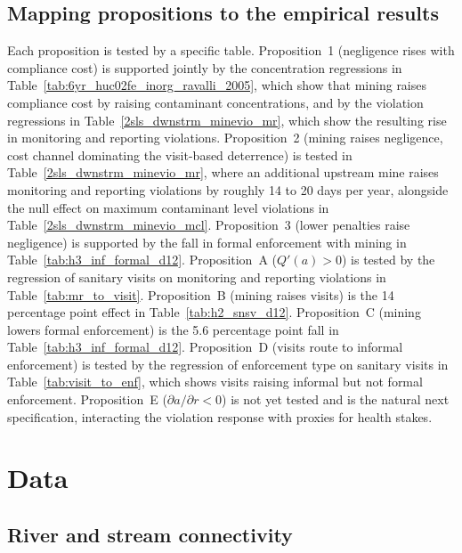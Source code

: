 \documentclass{article}
\begin{document}
\subsection{Mapping propositions to the empirical results}

Each proposition is tested by a specific table. Proposition~1 (negligence rises with compliance cost) is supported jointly by the concentration regressions in Table~\ref{tab:6yr_huc02fe_inorg_ravalli_2005}, which show that mining raises compliance cost by raising contaminant concentrations, and by the violation regressions in Table~\ref{2sls_dwnstrm_minevio_mr}, which show the resulting rise in monitoring and reporting violations. Proposition~2 (mining raises negligence, cost channel dominating the visit-based deterrence) is tested in Table~\ref{2sls_dwnstrm_minevio_mr}, where an additional upstream mine raises monitoring and reporting violations by roughly 14 to 20 days per year, alongside the null effect on maximum contaminant level violations in Table~\ref{2sls_dwnstrm_minevio_mcl}. Proposition~3 (lower penalties raise negligence) is supported by the fall in formal enforcement with mining in Table~\ref{tab:h3_inf_formal_d12}. Proposition~A ($Q'(a)>0$) is tested by the regression of sanitary visits on monitoring and reporting violations in Table~\ref{tab:mr_to_visit}. Proposition~B (mining raises visits) is the 14 percentage point effect in Table~\ref{tab:h2_snsv_d12}. Proposition~C (mining lowers formal enforcement) is the 5.6 percentage point fall in Table~\ref{tab:h3_inf_formal_d12}. Proposition~D (visits route to informal enforcement) is tested by the regression of enforcement type on sanitary visits in Table~\ref{tab:visit_to_enf}, which shows visits raising informal but not formal enforcement. Proposition~E ($\partial a/\partial r < 0$) is not yet tested and is the natural next specification, interacting the violation response with proxies for health stakes.

\section{Data}

\subsection{River and stream connectivity}
\end{document}
